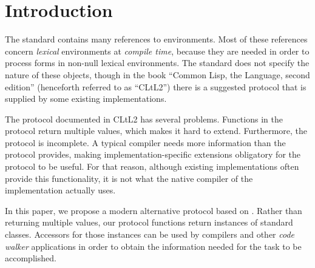 \section{Introduction}

The \commonlisp{} standard \cite{ansi:common:lisp} contains many
references to environments.  Most of these references concern
\emph{lexical} environments at \emph{compile time}, because they are
needed in order to process forms in non-null lexical environments.
The standard does not specify the nature of these objects, though in
the book ``Common Lisp, the Language, second edition''
\cite{Steele:1990:CLL:95411} (henceforth referred to as ``CLtL2'')
there is a suggested protocol that is supplied by some existing
\commonlisp{} implementations.

The protocol documented in CLtL2 has several problems.  Functions in
the protocol return multiple values, which makes it hard to extend.
Furthermore, the protocol is incomplete.  A typical compiler needs
more information than the protocol provides, making
implementation-specific extensions obligatory for the protocol to be
useful.  For that reason, although existing \commonlisp{}
implementations often provide this functionality, it is not what the
native compiler of the implementation actually uses.

In this paper, we propose a modern alternative protocol based on
\clos{}.  Rather than returning multiple values, our protocol
functions return instances of standard classes.  Accessors for those
instances can be used by compilers and other \emph{code walker}
applications in order to obtain the information needed for the task to
be accomplished.


